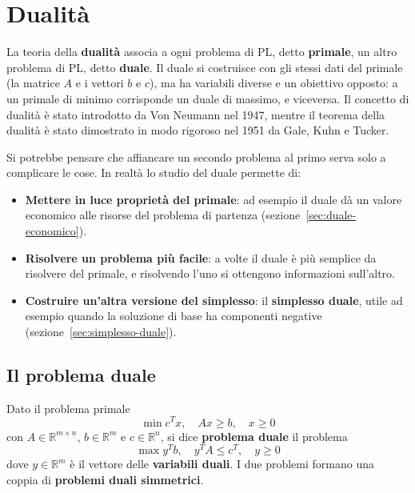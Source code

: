 \chapter{Dualità}\label{ch:dualita}
La teoria della \textbf{dualità} associa a ogni problema di PL, detto \textbf{primale}, un altro problema di PL, detto \textbf{duale}. Il duale si costruisce con gli stessi dati del primale (la matrice $A$ e i vettori $b$ e $c$), ma ha variabili diverse e un obiettivo opposto: a un primale di minimo corrisponde un duale di massimo, e viceversa. Il concetto di dualità è stato introdotto da Von Neumann nel 1947, mentre il teorema della dualità è stato dimostrato in modo rigoroso nel 1951 da Gale, Kuhn e Tucker.

Si potrebbe pensare che affiancare un secondo problema al primo serva solo a complicare le cose. In realtà lo studio del duale permette di:
\begin{itemize}
    \item \textbf{Mettere in luce proprietà del primale}: ad esempio il duale dà un valore economico alle risorse del problema di partenza (sezione~\ref{sec:duale-economico}).
    \item \textbf{Risolvere un problema più facile}: a volte il duale è più semplice da risolvere del primale, e risolvendo l'uno si ottengono informazioni sull'altro.
    \item \textbf{Costruire un'altra versione del simplesso}: il \textbf{simplesso duale}, utile ad esempio quando la soluzione di base ha componenti negative (sezione~\ref{sec:simplesso-duale}).
\end{itemize}

\section{Il problema duale}
\begin{definizione}\label{def:duale}
Dato il problema primale
\[
\min c^T x, \quad A x \ge b, \quad x \ge 0 \tag{P}
\]
con $A \in \mathbb{R}^{m \times n}$, $b \in \mathbb{R}^m$ e $c \in \mathbb{R}^n$, si dice \textbf{problema duale} il problema
\[
\max y^T b, \quad y^T A \le c^T, \quad y \ge 0 \tag{D}
\]
dove $y \in \mathbb{R}^m$ è il vettore delle \textbf{variabili duali}. I due problemi formano una coppia di \textbf{problemi duali simmetrici}.
\end{definizione}

